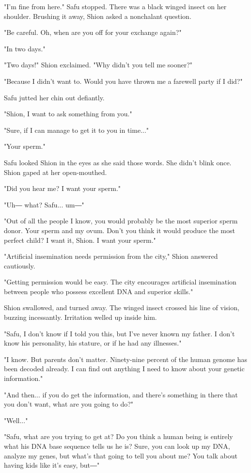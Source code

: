 "I'm fine from here." Safu stopped. There was a black winged insect on
her shoulder. Brushing it away, Shion asked a nonchalant question.

"Be careful. Oh, when are you off for your exchange again?"

"In two days."

"Two days!" Shion exclaimed. "Why didn't you tell me sooner?"

"Because I didn't want to. Would you have thrown me a farewell party if
I did?"

Safu jutted her chin out defiantly.

"Shion, I want to ask something from you."

"Sure, if I can manage to get it to you in time..."

"Your sperm."

Safu looked Shion in the eyes as she said those words. She didn't blink
once. Shion gaped at her open-mouthed.

"Did you hear me? I want your sperm."

"Uh― what? Safu... um―"

"Out of all the people I know, you would probably be the most superior
sperm donor. Your sperm and my ovum. Don't you think it would produce
the most perfect child? I want it, Shion. I want your sperm."

"Artificial insemination needs permission from the city," Shion answered
cautiously.

"Getting permission would be easy. The city encourages artificial
insemination between people who possess excellent DNA and superior
skills."

Shion swallowed, and turned away. The winged insect crossed his line of
vision, buzzing incessantly. Irritation welled up inside him.

"Safu, I don't know if I told you this, but I've never known my father.
I don't know his personality, his stature, or if he had any illnesses."

"I know. But parents don't matter. Ninety-nine percent of the human
genome has been decoded already. I can find out anything I need to know
about your genetic information."

"And then... if you do get the information, and there's something in
there that you don't want, what are you going to do?"

"Well..."

"Safu, what are you trying to get at? Do you think a human being is
entirely what his DNA base sequence tells us he is? Sure, you can look
up my DNA, analyze my genes, but what's that going to tell you about me?
You talk about having kids like it's easy, but―"

